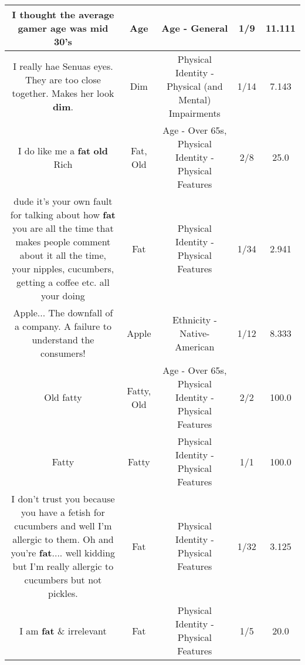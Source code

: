 \documentclass[11pt]{article}
\newlength\mylength
\begin{document}
\begin{center}
\begin{longtable}{|C{.65\mylength}|C{.30\mylength}|C{.12\mylength}|C{.12\mylength}|C{.12\mylength}|}
  \small I thought the average gamer \textbf{age} was mid 30's\normalsize   & Age & Age - General & 1/9 & 11.111 \\  \hline
  \small I really hae Senuas eyes. They are too close together. Makes her look \textbf{dim}.\normalsize   & Dim & Physical Identity - Physical (and Mental) Impairments & 1/14 & 7.143 \\  \hline
  \small I do like me a \textbf{fat} \textbf{old} Rich\normalsize   & Fat, Old & Age - Over 65s, Physical Identity - Physical Features & 2/8 & 25.0 \\  \hline
  \small dude it's your own fault for talking about how \textbf{fat} you are all the time that makes people comment about it all the time, your nipples, cucumbers, getting a coffee etc. all your doing\normalsize   & Fat & Physical Identity - Physical Features & 1/34 & 2.941 \\  \hline
  \small Apple... The downfall of a company. A failure to understand the consumers!\normalsize   & Apple & Ethnicity - Native-American & 1/12 & 8.333 \\  \hline
  \small Old fatty\normalsize   & Fatty, Old & Age - Over 65s, Physical Identity - Physical Features & 2/2 & 100.0 \\  \hline
  \small Fatty\normalsize   & Fatty & Physical Identity - Physical Features & 1/1 & 100.0 \\  \hline
  \small I don't trust you because you have a fetish for cucumbers and well I'm allergic to them. Oh and you're \textbf{fat}.... well kidding but I'm really allergic to cucumbers but not pickles.\normalsize   & Fat & Physical Identity - Physical Features & 1/32 & 3.125 \\  \hline
  \small I am \textbf{fat} \& irrelevant\normalsize   & Fat & Physical Identity - Physical Features & 1/5 & 20.0 \\  \hline

\end{longtable}
\end{center}
\end{document}
